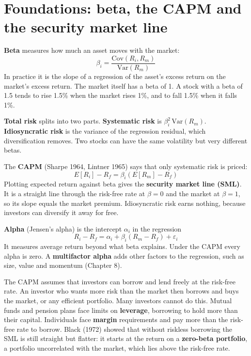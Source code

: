 \section{Foundations: beta, the CAPM and the security market line}
\label{sec:12-foundations}

\textbf{Beta} measures how much an asset moves with the market:
\begin{equation}
  \beta_i = \frac{\mathrm{Cov}(R_i, R_m)}{\mathrm{Var}(R_m)}
  \label{eq:12-beta}
\end{equation}
In practice it is the slope of a regression of the asset's excess return on the market's excess return. The market itself has a beta of 1. A stock with a beta of 1.5 tends to rise 1.5\% when the market rises 1\%, and to fall 1.5\% when it falls 1\%.

\textbf{Total risk} splits into two parts. \textbf{Systematic risk} is $\beta_i^2\,\mathrm{Var}(R_m)$. \textbf{Idiosyncratic risk} is the variance of the regression residual, which diversification removes. Two stocks can have the same volatility but very different betas.

The \textbf{CAPM} (Sharpe 1964, Lintner 1965) says that only systematic risk is priced:
\begin{equation}
  E[R_i] - R_f = \beta_i \left(E[R_m] - R_f\right)
  \label{eq:12-capm}
\end{equation}
Plotting expected return against beta gives the \textbf{security market line (SML)}. It is a straight line through the risk-free rate at $\beta = 0$ and the market at $\beta = 1$, so its slope equals the market premium. Idiosyncratic risk earns nothing, because investors can diversify it away for free.

\textbf{Alpha} (Jensen's alpha) is the intercept $\alpha_i$ in the regression
\begin{equation}
  R_i - R_f = \alpha_i + \beta_i (R_m - R_f) + \varepsilon_i
  \label{eq:12-alpha}
\end{equation}
It measures average return beyond what beta explains. Under the CAPM every alpha is zero. A \textbf{multifactor alpha} adds other factors to the regression, such as size, value and momentum (Chapter 8).

The CAPM assumes that investors can borrow and lend freely at the risk-free rate. An investor who wants more risk than the market then borrows and buys the market, or any efficient portfolio. Many investors cannot do this. Mutual funds and pension plans face limits on \textbf{leverage}, borrowing to hold more than their capital. Individuals face \textbf{margin} requirements and pay more than the risk-free rate to borrow. Black (1972) showed that without riskless borrowing the SML is still straight but flatter: it starts at the return on a \textbf{zero-beta portfolio}, a portfolio uncorrelated with the market, which lies above the risk-free rate.

